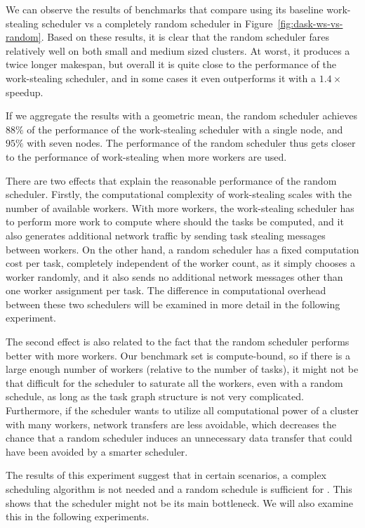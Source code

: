 We can observe the results of benchmarks that compare \dask{} using its
baseline work-stealing scheduler vs a completely random scheduler in
Figure~\ref{fig:dask-ws-vs-random}. Based on these results, it is clear that the random scheduler
fares relatively well on both small and medium sized clusters. At worst, it produces a twice longer
makespan, but overall it is quite close to the performance of the work-stealing scheduler, and in
some cases it even outperforms it with a $1.4\times$ speedup.

If we aggregate the results with a geometric mean, the random scheduler achieves
$88\%$ of the performance of the work-stealing scheduler with a single node,
and $95\%$ with seven nodes. The performance of the random scheduler thus gets
closer to the performance of work-stealing when more workers are used.

There are two effects that explain the reasonable performance of the random scheduler. Firstly, the
computational complexity of work-stealing scales with the number of available workers. With more
workers, the work-stealing scheduler has to perform more work to compute where should the tasks be
computed, and it also generates additional network traffic by sending task stealing messages
between workers. On the other hand, a random scheduler has a fixed computation cost per task,
completely independent of the worker count, as it simply chooses a worker randomly, and it also
sends no additional network messages other than one worker assignment per task. The difference in
computational overhead between these two schedulers will be examined in more detail in the
following experiment.

The second effect is also related to the fact that the random scheduler performs better with more
workers. Our benchmark set is compute-bound, so if there is a large enough number of workers
(relative to the number of tasks), it might not be that difficult for the scheduler to saturate all
the workers, even with a random schedule, as long as the task graph structure is not very
complicated. Furthermore, if the scheduler wants to utilize all computational power of a cluster
with many workers, network transfers are less avoidable, which decreases the chance that a random
scheduler induces an unnecessary data transfer that could have been avoided by a smarter scheduler.

The results of this experiment suggest that in certain scenarios, a complex scheduling algorithm is
not needed and a random schedule is sufficient for \dask{}. This shows that the
scheduler might not be its main bottleneck. We will also examine this in the following experiments.

